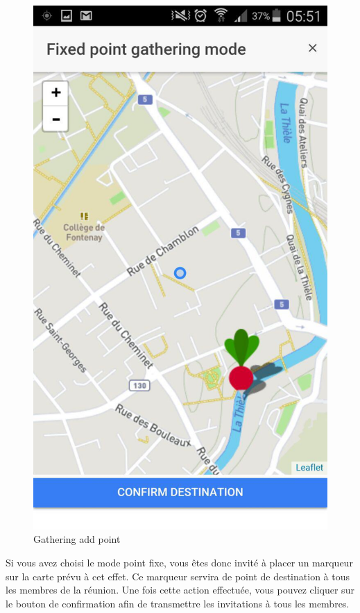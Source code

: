 \documentclass[french]{article}
\begin{document}
	\begin{figure}[H]
		\centering
		\includegraphics{../screenshot/screenshot-gathering-add-point}
		\caption{Gathering add point}
		\label{Gathering add point}
	\end{figure} 
	Si vous avez choisi le mode point fixe, vous êtes donc invité à placer un marqueur sur la carte prévu à cet effet. Ce marqueur servira de point de destination à tous les membres de la réunion. Une fois cette action effectuée, vous pouvez cliquer sur le bouton de confirmation afin de transmettre les invitations à tous les membres.
\end{document}
